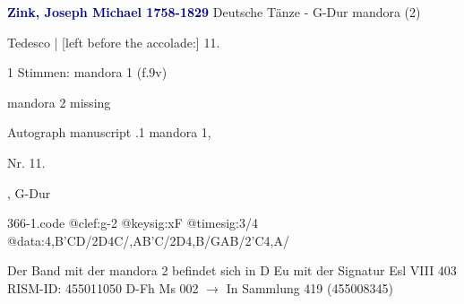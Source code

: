 \documentclass[twocolumn]{book}
\begin{document}
\newline \par \vspace{7pt} \textcolor{darkblue}{\textbf{Zink, Joseph Michael  1758-1829}}
\newline Deutsche Tänze - G-Dur
\newline mandora (2)
\newline \begin{itshape}[f.9v, at left:] Tedesco | [left before the accolade:] 11.\end{itshape} 
\newline \textcolor{darkblue}{}  1 Stimmen: mandora 1  (f.9v)
\newline \begin{small} mandora 2 missing\end{small} 
\newline Autograph manuscript
.1  mandora 1, \begin{itshape}Nr. 11.\end{itshape}, G-Dur  
\begin{filecontents*}{366-1.code}
@clef:g-2
@keysig:xF
@timesig:3/4
@data:4,B'CD/2D4C/,AB'C/2D4,B/GAB/2'C4,A/
\end{filecontents*}
\newline
%
\newline Der Band mit der mandora 2 befindet sich in D Eu mit der Signatur Esl VIII 403
\newline RISM-ID: 455011050
\newline D-Fh  Ms 002
\newline $\rightarrow$ In Sammlung 419 (455008345)
      
\end{document}
